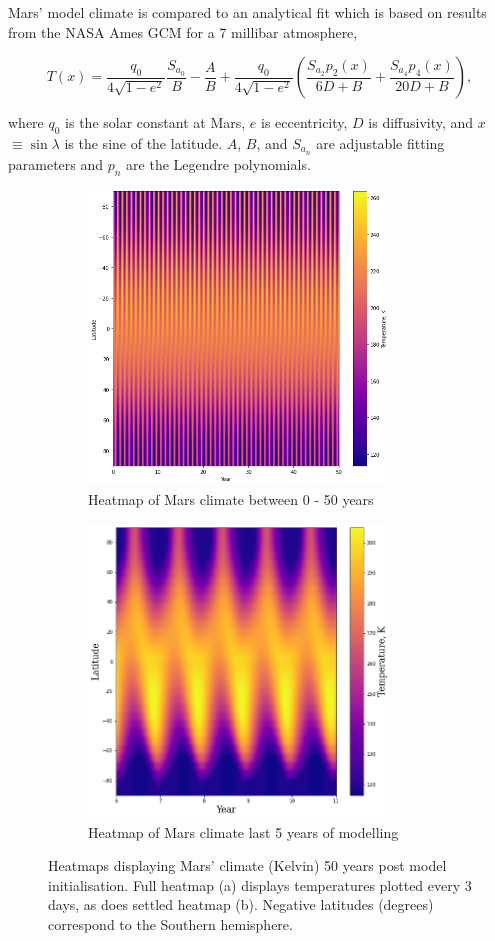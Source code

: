 \documentclass[12pt,onecolumn]{revtex4-2}    %
\begin{document}
Mars' model climate is compared to an analytical fit \cite{KH18} which is based on results from the NASA Ames GCM for a 7 millibar atmosphere, 

\begin{equation}
T(x) = \frac{q_{0}}{4 \sqrt{1 - e^{2}}} \frac{S_{a_{0}}}{B} - \frac{A}{B} + \frac{q_{0}}{4 \sqrt{1 - e^{2}}} (\frac{S_{a_{2}}p_{2}(x)}{6D+B} + \frac{S_{a_{4}}p_{4}(x)}{20D+B}),
\end{equation}

where $q_{0}$ is the solar constant at Mars, $e$ is eccentricity, $D$ is diffusivity, and $x$ $\equiv \sin\lambda$ is the sine of the latitude. $A$, $B$, and $S_{a_{n}}$ are adjustable fitting parameters and $p_{n}$ are the Legendre polynomials.

\begin{figure}
\begin{subfigure}{.5\textwidth}
  \centering
  \includegraphics[width = 8cm]{Mars50yrsHeatmap.png}
  \caption{Heatmap of Mars climate between 0 - 50 years}
  \label{fig:sub1}
\end{subfigure}%
\begin{subfigure}{.5\textwidth}
  \centering
  \includegraphics[width=8cm]{Mars5yrsHeatmap.png}
  \caption{Heatmap of Mars climate last 5 years of modelling}
  \label{fig:sub2}
\end{subfigure}
\raggedright
\caption{Heatmaps displaying Mars' climate (Kelvin) 50 years post model initialisation. Full heatmap (a) displays temperatures plotted every 3 days, as does settled heatmap (b). Negative latitudes (degrees) correspond to the Southern hemisphere.}
\label{fig:test}
\end{figure}
\end{document}
